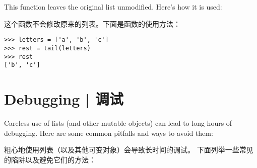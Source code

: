 %
This function leaves the original list unmodified.
Here's how it is used:

这个函数不会修改原来的列表。下面是函数的使用方法：

\begin{lstlisting}
>>> letters = ['a', 'b', 'c']
>>> rest = tail(letters)
>>> rest
['b', 'c']
\end{lstlisting}


\section{Debugging  |  调试}

Careless use of lists (and other mutable objects)
can lead to long hours of debugging.  Here are some common
pitfalls and ways to avoid them:

粗心地使用列表（以及其他可变对象）会导致长时间的调试。
下面列举一些常见的陷阱以及避免它们的方法：

